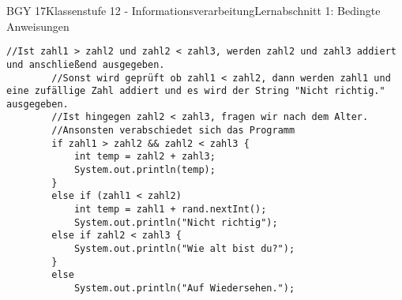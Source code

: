\documentclass[oneside,openany,headings=optiontotoc,11pt,numbers=noenddot]{scrreprt}
\begin{document}
\begin{worksheet}{BGY 17}{Klassenstufe 12 - Informationsverarbeitung}{Lernabschnitt 1: Bedingte Anweisungen}
\begin{lstlisting}[style=JavaInputStyle]
		//Ist zahl1 > zahl2 und zahl2 < zahl3, werden zahl2 und zahl3 addiert und anschließend ausgegeben.
		//Sonst wird geprüft ob zahl1 < zahl2, dann werden zahl1 und eine zufällige Zahl addiert und es wird der String "Nicht richtig." ausgegeben.
		//Ist hingegen zahl2 < zahl3, fragen wir nach dem Alter.
		//Ansonsten verabschiedet sich das Programm
		if zahl1 > zahl2 && zahl2 < zahl3 {
			int temp = zahl2 + zahl3;
			System.out.println(temp);
		}
		else if (zahl1 < zahl2)
			int temp = zahl1 + rand.nextInt();
			System.out.println("Nicht richtig");
		else if zahl2 < zahl3 {
			System.out.println("Wie alt bist du?");
		}
		else
			System.out.println("Auf Wiedersehen.");
		\end{lstlisting}
	\end{worksheet}
\end{document}
